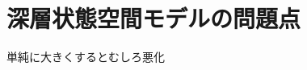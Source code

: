 \documentclass[10pt, twocolumn]{jarticle}
\begin{document}
\section{深層状態空間モデルの問題点}
単純に大きくするとむしろ悪化





\end{document}
